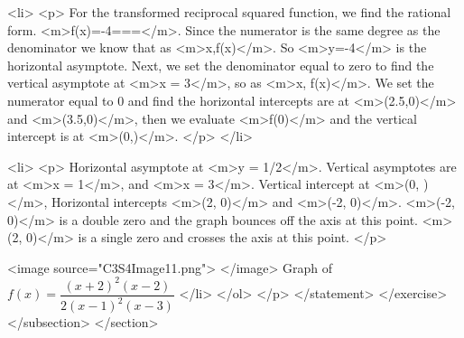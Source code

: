                         <li>
                            <p>
                                For the transformed reciprocal squared function, we find the rational form.
                                <m>f(x)=-4===</m>.
                                Since the numerator is the same degree as the denominator we know that as <m>x\to \pm\infty,f(x)</m>.
                                So <m>y=-4</m> is the horizontal asymptote.
                                Next, we set the denominator equal to zero to find the vertical asymptote at <m>x = 3</m>, so as <m>x, f(x)\to \infty</m>.
                                We set the numerator equal to 0 and find the horizontal intercepts are at <m>(2.5,0)</m> and <m>(3.5,0)</m>, then we evaluate <m>f(0)</m> and the vertical intercept is at <m>(0,)</m>.
                            </p>
                        </li>

                        <li>
                            <p>
                                Horizontal asymptote at <m>y = 1/2</m>.
                                Vertical asymptotes are at <m>x = 1</m>, and <m>x = 3</m>.
                                Vertical intercept at <m>(0, )</m>, Horizontal intercepts <m>(2, 0)</m> and <m>(-2, 0)</m>.
                                <m>(-2, 0)</m> is a double zero and the graph bounces off the axis at this point.
                                <m>(2, 0)</m> is a single zero and crosses the axis at this point.
                            </p>

                            <image source="C3S4Image11.png">
                            </image>
                            Graph of $f(x)=\dfrac{(x+2)^2 (x-2)}{2(x-1)^2 (x-3)}$
                        </li>
                    </ol>
                </p>
            </statement>
        </exercise>
    </subsection>
</section>